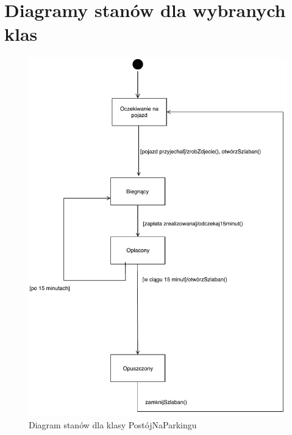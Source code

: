 \section{Diagramy stanów dla wybranych klas}
\label{sec:diagStanow}
\begin{figure}[H]
	\centering
	\includegraphics[width=130mm]{diagramy/DiagStanPostoj.pdf}
	\caption{Diagram stanów dla klasy PostójNaParkingu}
\end{figure}
